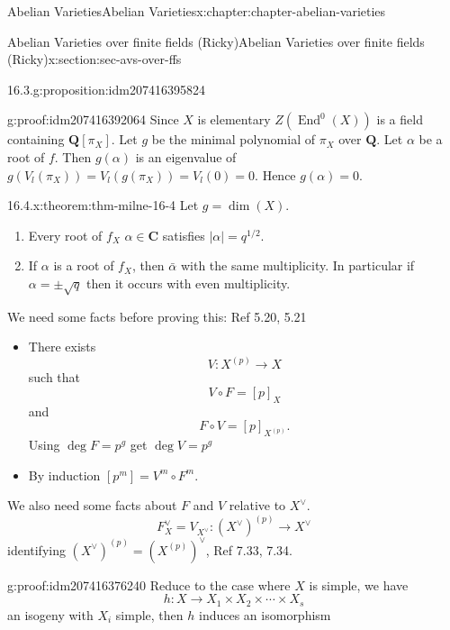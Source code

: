 \documentclass[oneside,10pt,]{book}
\numberwithin{equation}{section}
\newcommand{\lb}{[}
\newcommand{\rb}{]}
\newcommand{\QQ}{\mathbf{Q}}
\newcommand{\CC}{\mathbf{C}}
\DeclareMathOperator{\End}{End}
\begin{document}
\begin{chapterptx}{Abelian Varieties}{}{Abelian Varieties}{}{}{x:chapter:chapter-abelian-varieties}
\begin{sectionptx}{Abelian Varieties over finite fields (Ricky)}{}{Abelian Varieties over finite fields (Ricky)}{}{}{x:section:sec-avs-over-ffs}
\begin{proposition}{16.3.}{}{g:proposition:idm207416395824}
\end{proposition}
\begin{proofptx}{}{g:proof:idm207416392064}
Since \(X\) is elementary \(Z(\End^0(X))\) is  a field containing \(\QQ\lb \pi_X\rb\). Let \(g\) be the minimal polynomial of \(\pi_X\) over \(\QQ\). Let \(\alpha\) be a root of \(f\). Then \(g(\alpha)\) is an eigenvalue of \(g(V_l(\pi_X)) = V_l(g(\pi_X)) = V_l(0) = 0\). Hence \(g(\alpha) = 0\).%
\end{proofptx}
\begin{theorem}{16.4.}{}{x:theorem:thm-milne-16-4}%
Let \(g= \dim (X)\).%
\begin{enumerate}
\item{}Every root of \(f_X\) \(\alpha \in \CC\) satisfies \(|\alpha| = q^{1/2}\).%
\item{}If \(\alpha\) is  a root of \(f_X\), then \(\bar \alpha\) with the same multiplicity. In particular if \(\alpha = \pm \sqrt q\) then it occurs with even multiplicity.%
\end{enumerate}
%
\end{theorem}
We need some facts before proving this: Ref 5.20, 5.21%
\begin{itemize}[label=\textbullet]
\item{}There exists%
\begin{equation*}
V\colon X^{(p)} \to X
\end{equation*}
such that%
\begin{equation*}
V\circ F = [p]_X
\end{equation*}
and%
\begin{equation*}
F \circ V = [p]_{X^{(p)}}\text{.}
\end{equation*}
Using \(\deg F = p^g \)  get \(\deg V = p^g\)%
\item{}By induction \(\lb p^m\rb = V^m \circ F^m\).%
\end{itemize}
%
\par
We also need some facts about \(F\) and \(V\) relative to \(X^\vee\).%
\begin{equation*}
F_X^\vee = V_{X^\vee} \colon (X^\vee)^{(p)} \to X^\vee
\end{equation*}
identifying \((X^\vee)^{(p)} = (X^{(p)})^\vee\), Ref 7.33, 7.34.%
\begin{proofptx}{}{g:proof:idm207416376240}
Reduce to the case where \(X\) is simple, we have%
\begin{equation*}
h\colon X\to X_1 \times X_2 \times \cdots \times X_s
\end{equation*}
an isogeny with \(X_i\) simple, then \(h\) induces an isomorphism%

\end{proofptx}
\end{sectionptx}
\end{chapterptx}
\end{document}
